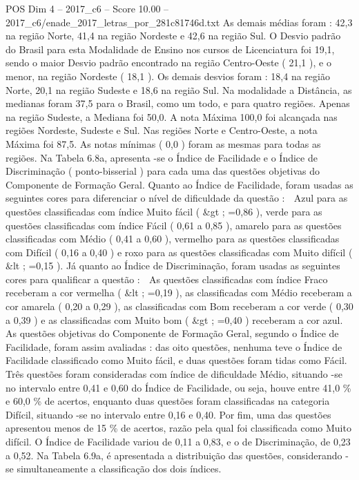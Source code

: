 \begin{textsample}{POS Dim 4 – 2017\_c6 – Score 10.00 – 2017\_c6/enade\_2017\_letras\_por\_281c81746d.txt}
As demais médias foram : 42,3 na região Norte, 41,4 na região Nordeste e 42,6 na região Sul.
O Desvio padrão do Brasil para esta Modalidade de Ensino nos cursos de Licenciatura foi 19,1, sendo o maior Desvio padrão encontrado na região Centro-Oeste ( 21,1 ), e o menor, na região Nordeste ( 18,1 ).
Os demais desvios foram : 18,4 na região Norte, 20,1 na região Sudeste e 18,6 na região Sul.
Na modalidade a Distância, as medianas foram 37,5 para o Brasil, como um todo, e para quatro regiões.
Apenas na região Sudeste, a Mediana foi 50,0.
A nota Máxima 100,0 foi alcançada nas regiões Nordeste, Sudeste e Sul.
Nas regiões Norte e Centro-Oeste, a nota Máxima foi 87,5.
As notas mínimas ( 0,0 ) foram as mesmas para todas as regiões.
Na Tabela 6.8a, apresenta -se o Índice de Facilidade e o Índice de Discriminação ( ponto-bisserial ) para cada uma das questões objetivas do Componente de Formação Geral.
Quanto ao Índice de Facilidade, foram usadas as seguintes cores para diferenciar o nível de dificuldade da questão :  Azul para as questões classificadas com índice Muito fácil ( \&gt ; =0,86 ), verde para as questões classificadas com índice Fácil ( 0,61 a 0,85 ), amarelo para as questões classificadas com Médio ( 0,41 a 0,60 ), vermelho para as questões classificadas com Difícil ( 0,16 a 0,40 ) e roxo para as questões classificadas com Muito difícil ( \&lt ; =0,15 ).
Já quanto ao Índice de Discriminação, foram usadas as seguintes cores para qualificar a questão :  As questões classificadas com índice Fraco receberam a cor vermelha ( \&lt ; =0,19 ), as classificadas com Médio receberam a cor amarela ( 0,20 a 0,29 ), as classificadas com Bom receberam a cor verde ( 0,30 a 0,39 ) e as classificadas com Muito bom ( \&gt ; =0,40 ) receberam a cor azul.
As questões objetivas do Componente de Formação Geral, segundo o Índice de Facilidade, foram assim avaliadas : das oito questões, nenhuma teve o Índice de Facilidade classificado como Muito fácil, e duas questões foram tidas como Fácil.
Três questões foram consideradas com índice de dificuldade Médio, situando -se no intervalo entre 0,41 e 0,60 do Índice de Facilidade, ou seja, houve entre 41,0 \% e 60,0 \% de acertos, enquanto duas questões foram classificadas na categoria Difícil, situando -se no intervalo entre 0,16 e 0,40.
Por fim, uma das questões apresentou menos de 15 \% de acertos, razão pela qual foi classificada como Muito difícil.
O Índice de Facilidade variou de 0,11 a 0,83, e o de Discriminação, de 0,23 a 0,52.
Na Tabela 6.9a, é apresentada a distribuição das questões, considerando -se simultaneamente a classificação dos dois índices.

\end{textsample}
